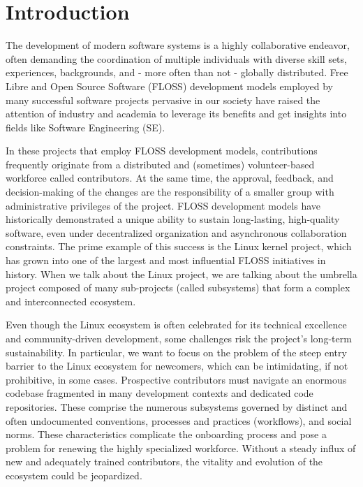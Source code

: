 \section{Introduction}
\label{sec:intro}

The development of modern software systems is a highly collaborative endeavor,
often demanding the coordination of multiple individuals with diverse skill
sets, experiences, backgrounds, and - more often than not - globally
distributed. Free Libre and Open Source Software (FLOSS) development models
employed by many successful software projects pervasive in our society have
raised the attention of industry and academia to leverage its benefits and get
insights into fields like Software Engineering (SE).

In these projects that employ FLOSS development models, contributions frequently
originate from a distributed and (sometimes) volunteer-based workforce called
contributors. At the same time, the approval, feedback, and decision-making of
the changes are the responsibility of a smaller group with administrative
privileges of the project. FLOSS development models have historically
demonstrated a unique ability to sustain long-lasting, high-quality software,
even under decentralized organization and asynchronous collaboration
constraints. The prime example of this success is the Linux kernel project,
which has grown into one of the largest and most influential FLOSS initiatives
in history. When we talk about the Linux project, we are talking about the
umbrella project composed of many sub-projects (called subsystems) that form a
complex and interconnected ecosystem.

Even though the Linux ecosystem is often celebrated for its technical excellence
and community-driven development, some challenges risk the project's long-term
sustainability. In particular, we want to focus on the problem of the steep
entry barrier to the Linux ecosystem for newcomers, which can be intimidating,
if not prohibitive, in some cases. Prospective contributors must navigate an
enormous codebase fragmented in many development contexts and dedicated code
repositories. These comprise the numerous subsystems governed by distinct and
often undocumented conventions, processes and practices (workflows), and social
norms. These characteristics complicate the onboarding process and pose a
problem for renewing the highly specialized workforce. Without a steady influx
of new and adequately trained contributors, the vitality and evolution of the
ecosystem could be jeopardized.

